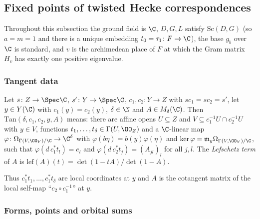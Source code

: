 \subsection{Fixed points of twisted Hecke correspondences}\label{pf:ks2:sec:fix}

Throughout this subsection the ground field is $\C$, $D,G,L$ satisfy $\mathrm{Sc}(D,G)$ (so $a=m=1$
and there is a unique embedding $t_0=\tau_1\colon F\to\C$), the base $g_b$ over $\C$ is standard,
and $v$ is the archimedean place of $F$ at which the Gram matrix $H_v$ has exactly one positive
eigenvalue.

\subsubsection{Tangent data}

\begin{definition}\label{pf:ks2:def:istan}
Let $s\colon Z\to\Spec\C$, $s'\colon Y\to\Spec\C$, $c_1,c_2\colon Y\to Z$ with $sc_1=sc_2=s'$, let
$y\in Y(\C)$ with $c_1(y)=c_2(y)$, $\delta\in\N$ and $A\in M_\delta(\C)$. Then
$\mathrm{Tan}(\delta,c_1,c_2,y,A)$ means: there are affine opens
$U\subseteq Z$ and $V\subseteq c_1^{-1}U\cap c_2^{-1}U$ with $y\in V$, functions
$t_1,\dots,t_\delta\in\Gamma(U,\OO_Z)$ and a $\C$-linear map
$\varphi\colon\Omega_{\Gamma(V,\OO_Y)/\C}\to\C^\delta$ with $\varphi(b\eta)=b(y)\varphi(\eta)$ and
$\ker\varphi=\mathfrak m_y\Omega_{\Gamma(V,\OO_Y)/\C}$, such that $\varphi(d\,c_1^*t_l)=e_l$ and
$\varphi(d\,c_2^*t_j)=(A_{jl})_l$ for all $j,l$. The \emph{Lefschetz term} of $A$ is
$\mathrm{lef}(A)(t)=\det(1-tA)/\det(1-A)$.
\end{definition}

Thus $c_1^*t_1,\dots,c_1^*t_\delta$ are local coordinates at $y$ and $A$ is the cotangent matrix of
the local self-map ``$c_2\circ c_1^{-1}$'' at $y$.

\subsubsection{Forms, points and orbital sums}

